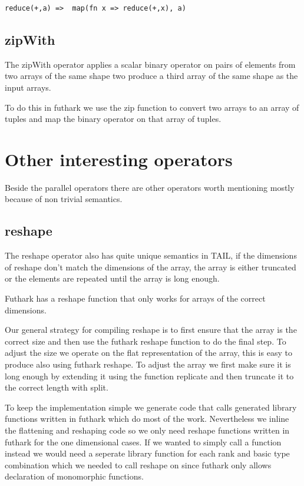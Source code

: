 \documentclass[11pt]{article}
\begin{document}
\begin{lstlisting}[numbers=none,frame=none]
reduce(+,a)	=> 	map(fn x => reduce(+,x), a)
\end{lstlisting}

\subsection{zipWith}

The zipWith operator applies a scalar binary operator on pairs of elements from two arrays of the same shape two
produce a third array of the same shape as the input arrays.

 To do this in futhark we use the zip function to convert two arrays to an array of tuples and map the binary operator on that array of tuples.

\section{Other interesting operators}

Beside the parallel operators there are other operators worth mentioning mostly because of non trivial semantics.  

\subsection{reshape}

The reshape operator also has quite unique semantics in TAIL, if the dimensions of reshape don't match the dimensions of the array, the
array is either truncated or the elements are repeated until the array is long enough.

Futhark has a reshape function that only works for arrays of the correct dimensions.

Our general strategy for compiling reshape is to first ensure that the array is the correct size and then use the futhark reshape
function to do the final step. To adjust the size we operate on the flat representation of the array, this is easy to produce also
using futhark reshape. To adjust the array we first make sure it is long enough by extending it using the function replicate and then
truncate it to the correct length with split.

To keep the implementation simple we generate code that calls generated library functions written in futhark which do most of the work.
Nevertheless we inline the flattening and reshaping code so we only need reshape functions written in futhark
for the one dimensional cases. If we wanted to simply call a function instead we would need a seperate library function for each
rank and basic type combination which we needed to call reshape on since futhark only allows declaration of monomorphic functions.
\end{document}
